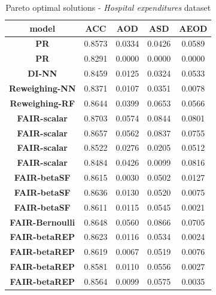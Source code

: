 \documentclass[preprint,12pt]{elsarticle}
\begin{document}
\begin{table}
	\centering
	\caption{Pareto optimal solutions - \textit{Hospital expenditures} dataset}
	\begin{tabular}{|c|c|c|c|c|}
		\hline
		\textbf{model}           & \textbf{ACC} & \textbf{AOD} & \textbf{ASD} & \textbf{AEOD} \\ \hline
		\textbf{PR}              & 0.8573       & 0.0334       & 0.0426       & 0.0589        \\ \hline
		\textbf{PR}              & 0.8291       & 0.0000       & 0.0000       & 0.0000        \\ \hline
		\textbf{DI-NN}           & 0.8459       & 0.0125       & 0.0324       & 0.0533        \\ \hline
		\textbf{Reweighing-NN}   & 0.8371       & 0.0107       & 0.0351       & 0.0078        \\ \hline
		\textbf{Reweighing-RF}   & 0.8644       & 0.0399       & 0.0653       & 0.0566        \\ \hline
		\textbf{FAIR-scalar}     & 0.8703       & 0.0574       & 0.0844       & 0.0801        \\ \hline
		\textbf{FAIR-scalar}     & 0.8657       & 0.0562       & 0.0837       & 0.0755        \\ \hline
		\textbf{FAIR-scalar}     & 0.8522       & 0.0276       & 0.0205       & 0.0512        \\ \hline
		\textbf{FAIR-scalar}     & 0.8484       & 0.0426       & 0.0099       & 0.0816        \\ \hline
		\textbf{FAIR-betaSF}     & 0.8615       & 0.0030       & 0.0502       & 0.0127        \\ \hline
		\textbf{FAIR-betaSF}     & 0.8636       & 0.0130       & 0.0520       & 0.0075        \\ \hline
		\textbf{FAIR-betaSF}     & 0.8611       & 0.0115       & 0.0545       & 0.0021        \\ \hline
		\textbf{FAIR-Bernoulli}  & 0.8648       & 0.0560       & 0.0866       & 0.0705        \\ \hline
		\textbf{FAIR-betaREP}    & 0.8623       & 0.0116       & 0.0534       & 0.0024        \\ \hline
		\textbf{FAIR-betaREP}    & 0.8619       & 0.0067       & 0.0519       & 0.0076        \\ \hline
		\textbf{FAIR-betaREP}    & 0.8581       & 0.0110       & 0.0556       & 0.0027        \\ \hline
		\textbf{FAIR-betaREP}    & 0.8564       & 0.0099       & 0.0575       & 0.0035        \\ \hline

\end{tabular}
\end{table}
\end{document}
